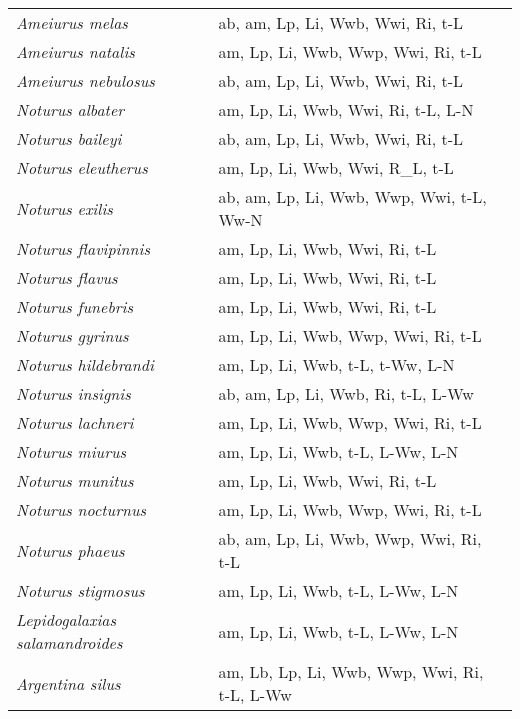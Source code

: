 {\begin{longtable}[c]{p{3.5cm}p{5.5cm}p{5.5cm}}
\emph{Ameiurus melas} &  ab, am, Lp, Li, Wwb, Wwi, Ri, t-L & \citet{CoppTerk2016} \\
\emph{Ameiurus natalis} &  am, Lp, Li, Wwb, Wwp, Wwi, Ri, t-L &  \\
\emph{Ameiurus nebulosus} &  ab, am, Lp, Li, Wwb, Wwi, Ri, t-L & \citet{GashBass1973} \\
\emph{Noturus albater} &  am, Lp, Li, Wwb, Wwi, Ri, t-L, L-N & \citet{MaydBroo1980} \\
\emph{Noturus baileyi} &  ab, am, Lp, Li, Wwb, Wwi, Ri, t-L & \citet{DinkShut1996} \\
\emph{Noturus eleutherus} &  am, Lp, Li, Wwb, Wwi, R\_L, t-L & \citet{StarStar1985} \\
\emph{Noturus exilis} &  ab, am, Lp, Li, Wwb, Wwp, Wwi, t-L, Ww-N & \citet{Vive1987} \\
\emph{Noturus flavipinnis} &  am, Lp, Li, Wwb, Wwi, Ri, t-L & \citet{DinkShut1996} \\
\emph{Noturus flavus} &  am, Lp, Li, Wwb, Wwi, Ri, t-L & \citet{PucaDParr2018} \\
\emph{Noturus funebris} &  am, Lp, Li, Wwb, Wwi, Ri, t-L & \citet{BennKuha2008} \\
\emph{Noturus gyrinus} &  am, Lp, Li, Wwb, Wwp, Wwi, Ri, t-L &  \\
\emph{Noturus hildebrandi} &  am, Lp, Li, Wwb, t-L, t-Ww, L-N & \citet{MaydWals1984,BakeHein1994} \\
\emph{Noturus insignis} &  ab, am, Lp, Li, Wwb, Ri, t-L, L-Ww & \citet{ClugCoop1960} \\
\emph{Noturus lachneri} &  am, Lp, Li, Wwb, Wwp, Wwi, Ri, t-L & \citet{TumiHard2014} \\
\emph{Noturus miurus} &  am, Lp, Li, Wwb, t-L, L-Ww, L-N & \citet{BrooMayd1982} \\
\emph{Noturus munitus} &  am, Lp, Li, Wwb, Wwi, Ri, t-L & \citet{StarStar1985,BennKua2010} \\
\emph{Noturus nocturnus} &  am, Lp, Li, Wwb, Wwp, Wwi, Ri, t-L &  \\
\emph{Noturus phaeus} &  ab, am, Lp, Li, Wwb, Wwp, Wwi, Ri, t-L & \citet{SimoWall2003,ChanPars2000} \\
\emph{Noturus stigmosus} &  am, Lp, Li, Wwb, t-L, L-Ww, L-N & \citet{Sche2003} \\
\emph{Lepidogalaxias salamandroides} &  am, Lp, Li, Wwb, t-L, L-Ww, L-N & \citet{MorgGill2000} \\
\emph{Argentina silus} &  am, Lb, Lp, Li, Wwb, Wwp, Wwi, Ri, t-L, L-Ww & \citet{MunkNiel2005,Magn2007} \\

\end{longtable}}

